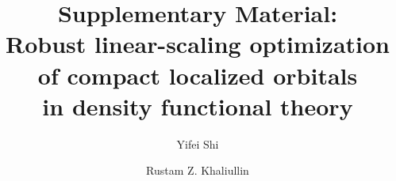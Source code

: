 \documentclass[aps,prl,twocolumn,reprint,amsmath,amssymb]{revtex4-1}
\begin{document}
\newcommand{\Ang}{\ensuremath{\mathring{\text{A}}}}
\newcommand{\ltwid}{\mathrel{\raise.3ex\hbox{$<$\kern-.75em\lower1ex\hbox{$\sim$}}}}
\newcommand{\gtwid}{\mathrel{\raise.3ex\hbox{$>$\kern-.75em\lower1ex\hbox{$\sim$}}}}
\newcommand{\ket}[1]{\ensuremath{\vert #1 \rangle}}
\newcommand{\bra}[1]{\ensuremath{\langle #1 \vert}}
\newcommand{\braket}[2]{\ensuremath{\langle #1 \vert #2 \rangle}} %
\newcommand{\ketbra}[2]{\ensuremath{\vert #1 \rangle \langle #2 \vert}} %
\newcommand{\op}[1]{\ensuremath{\hat{#1}}} %
\newcommand{\sill}{\psi}
\newcommand{\trace}{{\rm Tr}}
\newcommand{\ntilde}{\tilde{n}}
\newcommand{\stilde}{\tilde{s}}
\newcommand{\atilde}{\tilde{\alpha}}
\newcommand{\new}{\color{red}}
\newcommand{\old}{\color{black}}
\newcommand{\bea}{\begin{eqnarray}}
\newcommand{\eea}{\end{eqnarray}}
\newcommand{\br}{\ensuremath{\mathbf{r}}}
\def\nn{\nonumber\\}



\title{Supplementary Material:\\
Robust linear-scaling optimization of compact localized orbitals\\
in density functional theory}

\author{Yifei Shi}
\author{Rustam Z. Khaliullin}

\setcounter{equation}{0}
\setcounter{figure}{0}

\renewcommand{\theequation}{S\arabic{equation}}
\renewcommand{\thefigure}{S\arabic{figure}}



\maketitle
\end{document}
